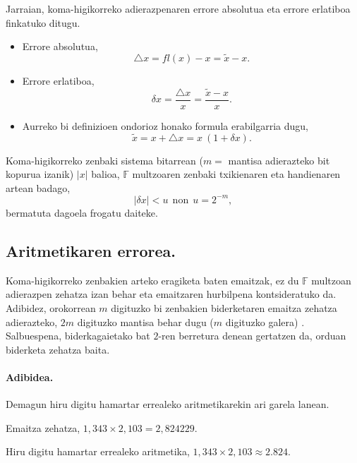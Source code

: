 Jarraian, koma-higikorreko adierazpenaren errore absolutua eta errore erlatiboa finkatuko ditugu.
\begin{itemize}
\item Errore absolutua,
\begin{equation*}
\triangle x= fl(x)-x= \tilde{x}-x. 
\end{equation*} 
\item Errore erlatiboa, 
\begin{equation*}
\delta x =\frac{\triangle x}{x} = \frac{\tilde{x}-x}{x}. 
\end{equation*}
\item Aurreko bi definizioen ondorioz honako formula erabilgarria dugu,
\begin{equation*}
\tilde{x}= x+\triangle x = x \ (1+\delta x).
\end{equation*}
\end{itemize}

Koma-higikorreko zenbaki sistema bitarrean ($m=$ mantisa adierazteko bit kopurua izanik) $|x|$ balioa, $\mathbb{F}$ multzoaren zenbaki txikienaren eta handienaren artean badago,
\begin{equation*}
 |\delta x|< u \ \ \text{non} \ \ u=2^{-m},
 \end{equation*}
bermatuta dagoela frogatu daiteke.

\subsection*{Aritmetikaren errorea.} 

Koma-higikorreko zenbakien arteko eragiketa baten emaitzak, ez du $\mathbb{F}$ multzoan adierazpen zehatza izan behar eta emaitzaren hurbilpena kontsideratuko da. Adibidez, orokorrean $m$ digituzko bi zenbakien biderketaren emaitza zehatza adierazteko, $2m$ digituzko mantisa behar dugu ($m$ digituzko galera) \cite{Fukushima2001}. Salbuespena, biderkagaietako bat $2$-ren berretura denean gertatzen da, orduan biderketa zehatza baita.

\paragraph*{Adibidea.} Demagun hiru digitu hamartar errealeko aritmetikarekin ari garela lanean.

Emaitza zehatza, $1,343 \times 2,103 = 2,824229$. 

Hiru digitu hamartar errealeko aritmetika, $1,343 \times 2,103 \approx 2.824$.

